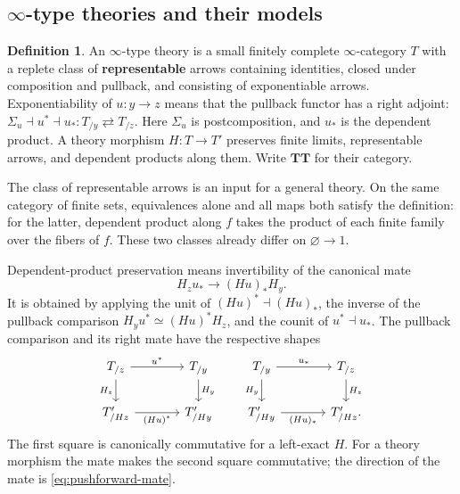\documentclass[oneside]{article}
\theoremstyle{plain}
\theoremstyle{definition}
\newtheorem{definition}[theorem]{Definition}
\theoremstyle{remark}
\newcommand{\TT}{\mathbf{TT}}
\begin{document}
\subsection{\texorpdfstring{$\infty$-type theories and their models}{Infinity-type theories and their models}}
\label{subsec:infty-type-theory}

\begin{definition}
\label{def:infty-type-theory}
    An $\infty$-type theory is a small finitely complete $\infty$-category $T$ with a replete class of \textbf{representable} arrows containing identities, closed under composition and pullback, and consisting of exponentiable arrows. Exponentiability of $u:y\to z$ means that the pullback functor has a right adjoint: $\Sigma_u\dashv u^*\dashv u_*: T_{/y}\rightleftarrows T_{/z}.$ Here $\Sigma_u$ is postcomposition, and $u_*$ is the dependent product. A theory morphism $H:T\to T'$ preserves finite limits, representable arrows, and dependent products along them. Write $\TT$ for their category.
\end{definition}

The class of representable arrows is an input for a general theory.
On the same category of finite sets, equivalences alone and all maps
both satisfy the definition: for the latter, dependent product along
$f$ takes the product of each finite family over the fibers of $f$.
These two classes already differ on $\varnothing\to 1$.

Dependent-product preservation means invertibility of the canonical mate
\begin{equation}
\label{eq:pushforward-mate}
     H_z u_*\longrightarrow(Hu)_*H_y.
\end{equation}
It is obtained by applying the unit of $(Hu)^*\dashv(Hu)_*$, the inverse of the pullback comparison $H_yu^*\simeq(Hu)^*H_z$, and the counit of $u^*\dashv u_*$.  The pullback comparison and its right mate have the respective shapes
\[
    \begin{tikzcd}[column sep=large]
        T_{/z}\ar[r,"u^*"]\ar[d,"H_z"']&
        T_{/y}\ar[d,"H_y"]\\
        T'_{/Hz}\ar[r,"(Hu)^*"']&T'_{/Hy}
    \end{tikzcd}
    \qquad
    \begin{tikzcd}[column sep=large]
        T_{/y}\ar[r,"u_*"]\ar[d,"H_y"']&
        T_{/z}\ar[d,"H_z"]\\
        T'_{/Hy}\ar[r,"(Hu)_*"']&T'_{/Hz}.
    \end{tikzcd}
\]
The first square is canonically commutative for a left-exact $H$. For a theory morphism the mate makes the second square commutative; the direction of the mate is \eqref{eq:pushforward-mate}.
\end{document}
